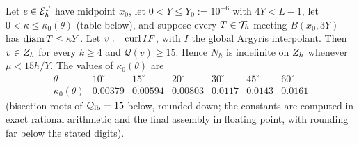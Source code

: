\begin{theorem}\label{pb:thmA}
Let $e\in\mathcal E_h^\Gamma$ have midpoint $x_0$, let $0<Y\le Y_0:=10^{-6}$ with $4Y<L-1$, let $0<\kappa\le\kappa_0(\theta)$ (table below), and suppose every $T\in\mathcal T_h$ meeting $B(x_0,3Y)$ has $\operatorname{diam} T\le\kappa Y$. Let $v:=\operatorname{curl} I F$, with $I$ the global
Argyris interpolant. Then $v\in Z_h$ for every $k\ge4$ and $\mathcal Q(v)\ge15$. Hence $N_h$ is indefinite on $Z_h$ whenever
$\mu<15h/Y$. The values of $\kappa_0(\theta)$ are
\[\begin{array}{c|cccccc}\theta&10^\circ&15^\circ&20^\circ&30^\circ&45^\circ&60^\circ\\\hline
\kappa_0(\theta)&0.00379&0.00594&0.00803&0.0117&0.0143&0.0161\end{array}\]
(bisection roots of $\mathcal Q_{\rm lb}=15$ below, rounded down; the constants are computed in exact rational arithmetic and the final assembly in floating point, with rounding far below the stated digits).
\end{theorem}
